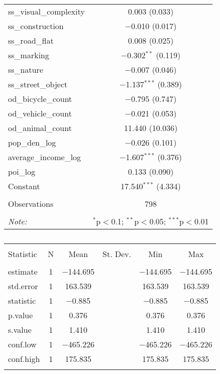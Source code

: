 \begin{table}[!htbp]
\begin{tabular}{@{\extracolsep{1pt}}lc}
  ss\_visual\_complexity & 0.003 (0.033) \\ 
  ss\_construction & $-$0.010 (0.017) \\ 
  ss\_road\_flat & 0.008 (0.025) \\ 
  ss\_marking & $-$0.302$^{**}$ (0.119) \\ 
  ss\_nature & $-$0.007 (0.046) \\ 
  ss\_street\_object & $-$1.137$^{***}$ (0.389) \\ 
  od\_bicycle\_count & $-$0.795 (0.747) \\ 
  od\_vehicle\_count & $-$0.021 (0.053) \\ 
  od\_animal\_count & 11.440 (10.036) \\ 
  pop\_den\_log & $-$0.026 (0.101) \\ 
  average\_income\_log & $-$1.607$^{***}$ (0.376) \\ 
  poi\_log & 0.133 (0.090) \\ 
  Constant & 17.540$^{***}$ (4.334) \\ 
 \hline \\[-1.8ex] 
Observations & 798 \\ 
\hline 
\hline \\[-1.8ex] 
\textit{Note:}  & \multicolumn{1}{r}{$^{*}$p$<$0.1; $^{**}$p$<$0.05; $^{***}$p$<$0.01} \\ 
\end{tabular} 
\end{table} 

\begin{table}[!htbp] \centering 
  \caption{} 
  \label{} 
\small 
\begin{tabular}{@{\extracolsep{1pt}}lccccc} 
\\[-1.8ex]\hline 
\hline \\[-1.8ex] 
Statistic & \multicolumn{1}{c}{N} & \multicolumn{1}{c}{Mean} & \multicolumn{1}{c}{St. Dev.} & \multicolumn{1}{c}{Min} & \multicolumn{1}{c}{Max} \\ 
\hline \\[-1.8ex] 
estimate & 1 & $-$144.695 &  & $-$144.695 & $-$144.695 \\ 
std.error & 1 & 163.539 &  & 163.539 & 163.539 \\ 
statistic & 1 & $-$0.885 &  & $-$0.885 & $-$0.885 \\ 
p.value & 1 & 0.376 &  & 0.376 & 0.376 \\ 
s.value & 1 & 1.410 &  & 1.410 & 1.410 \\ 
conf.low & 1 & $-$465.226 &  & $-$465.226 & $-$465.226 \\ 
conf.high & 1 & 175.835 &  & 175.835 & 175.835 \\ 
\hline \\[-1.8ex] 
\end{tabular} 
\end{table} 

